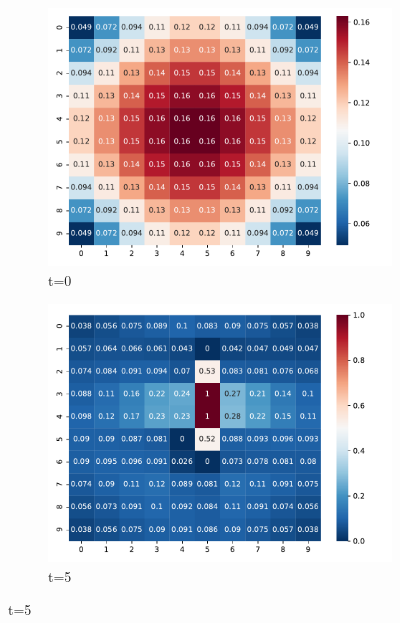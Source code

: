 \begin{figure}
    \centering
    \begin{subfigure}{0.4\textwidth}
        \includegraphics[scale=0.4]{figure/pmatrix/0.pdf}
        \caption{t=0}
    \end{subfigure}
    \begin{subfigure}{0.4\textwidth}
        \includegraphics[scale=0.4]{figure/pmatrix/5.pdf}
        \caption{t=5}
    \end{subfigure}
    

\end{figure}
